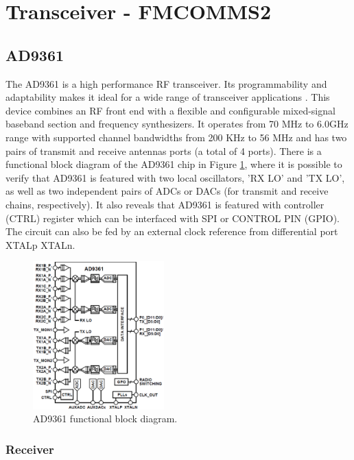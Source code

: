 \section{Transceiver - FMCOMMS2}

\subsection{AD9361}
\label{trans:ad9361}

The AD9361 is a high performance RF transceiver. Its programmability and
adaptability makes it ideal for a wide range of transceiver applications
\cite{web:ad9361wiki}. This device combines an RF front end with a flexible and
configurable mixed-signal baseband section and frequency synthesizers. It
operates from 70 MHz to 6.0GHz range with supported channel bandwidths from 200
KHz to 56 MHz and has two pairs of transmit and receive antennas ports (a total
of 4 ports). There is a functional block diagram of the AD9361 chip in Figure
\ref{fig:ad9361func}, where it is possible to verify that AD9361 is featured with
two local oscillators, 'RX LO' and 'TX LO', as well as two independent pairs of
ADCs or DACs (for transmit and receive chains, respectively). It also reveals
that AD9361 is featured with controller (CTRL) register which can be interfaced
with SPI or CONTROL PIN (GPIO). The circuit can also be fed by an external clock
reference from differential port XTALp XTALn.

\begin{figure}[htbp]
    \centering
    \includegraphics[width=0.45\textwidth]{./figures/ad9361_functional_diagram}
    \caption{ AD9361 functional block diagram.
    \label{fig:ad9361func}}
\end{figure}

\subsubsection{Receiver}

